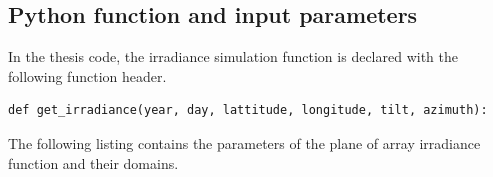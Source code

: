 







\subsection{Python function and input parameters} 
In the thesis code, the irradiance simulation function is declared with the following function header.

\begin{lstlisting}[caption={PVlib POA simulation function header.}, label={poa_header}]
def get_irradiance(year, day, lattitude, longitude, tilt, azimuth):
\end{lstlisting}


\noindent The following listing contains the parameters of the plane of array irradiance function and their domains.

